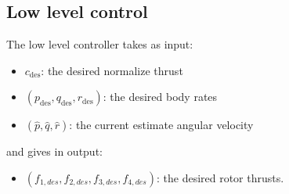 
\subsection{Low level control}
The low level controller takes as input:
 \begin{itemize}
\item $c_{\mathrm{des}}$: the desired normalize thrust 
\item $(p_\mathrm{des},q_\mathrm{des},r_\mathrm{des})$: the desired body rates
\item $(\hat{p},\hat{q},\hat{r})$: the current estimate angular velocity
\end{itemize}
and gives in output:
\begin{itemize}
\item $(f_{1,des},f_{2,des},f_{3,des},f_{4,des})$: the desired rotor thrusts.
\end{itemize}

